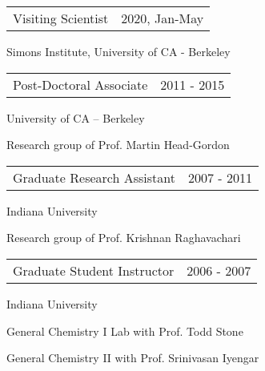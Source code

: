 \documentclass[10pt]{article}
\newenvironment{innerlist}[1][\enskip\textbullet]%
        {\begin{compactitem}[#1]}{\end{compactitem}}
\begin{document}
\vspace{-8pt}
\begin{tabular}{p{240pt} l}
Visiting Scientist  & 2020, Jan-May
\end{tabular}
\begin{innerlist}
\item[\hspace*{20pt}] Simons Institute, University of CA - Berkeley \\
\end{innerlist}

\vspace{-8pt}
\begin{tabular}{p{240pt} l}
Post-Doctoral Associate  & 2011 - 2015
\end{tabular}
\begin{innerlist}
\item[\hspace*{20pt}] University of CA -- Berkeley
\item[\hspace*{20pt}] Research group of Prof. Martin Head-Gordon\\
\end{innerlist}

\vspace{-8pt}

\begin{tabular}{p{240pt} l}
Graduate Research Assistant  & 2007 - 2011
\end{tabular}
\begin{innerlist}
\item[\hspace*{20pt}] Indiana University
\item[\hspace*{20pt}] Research group of Prof. Krishnan Raghavachari\\
\end{innerlist}

\vspace{-8pt}

\begin{tabular}{p{240pt} l}
Graduate Student Instructor  & 2006 - 2007
\end{tabular}
\begin{innerlist}
\item[\hspace*{20pt}] Indiana University
\item[\hspace*{20pt}] General Chemistry I Lab with Prof. Todd Stone
\item[\hspace*{20pt}] General Chemistry II with Prof. Srinivasan Iyengar\\
\end{innerlist}
%
\vspace{-8pt}
\end{document}
